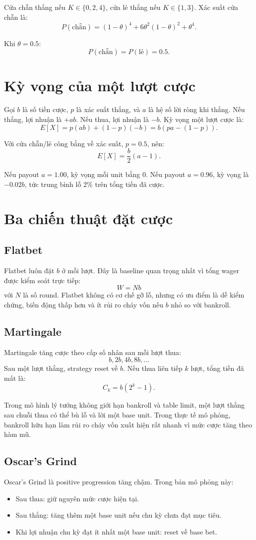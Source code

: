 \documentclass[12pt,a4paper]{article}
\begin{document}
Cửa chẵn thắng nếu \(K \in \{0,2,4\}\), cửa lẻ thắng nếu \(K \in \{1,3\}\). Xác suất cửa chẵn là:
\[
P(\text{chẵn})=(1-\theta)^4+6\theta^2(1-\theta)^2+\theta^4.
\]

Khi \(\theta=0.5\):
\[
P(\text{chẵn})=P(\text{lẻ})=0.5.
\]

\section{Kỳ vọng của một lượt cược}
Gọi \(b\) là số tiền cược, \(p\) là xác suất thắng, và \(a\) là hệ số lời ròng khi thắng. Nếu thắng, lợi nhuận là \(+ab\). Nếu thua, lợi nhuận là \(-b\). Kỳ vọng một lượt cược là:
\[
E[X]=p(ab)+(1-p)(-b)=b(pa-(1-p)).
\]

Với cửa chẵn/lẻ công bằng về xác suất, \(p=0.5\), nên:
\[
E[X]=\frac{b}{2}(a-1).
\]

Nếu payout \(a=1.00\), kỳ vọng mỗi unit bằng 0. Nếu payout \(a=0.96\), kỳ vọng là \(-0.02b\), tức trung bình lỗ 2\% trên tổng tiền đã cược.

\section{Ba chiến thuật đặt cược}
\subsection{Flatbet}
Flatbet luôn đặt \(b\) ở mỗi lượt. Đây là baseline quan trọng nhất vì tổng wager được kiểm soát trực tiếp:
\[
W=Nb
\]
với \(N\) là số round. Flatbet không có cơ chế gỡ lỗ, nhưng có ưu điểm là dễ kiểm chứng, biến động thấp hơn và ít rủi ro cháy vốn nếu \(b\) nhỏ so với bankroll.

\subsection{Martingale}
Martingale tăng cược theo cấp số nhân sau mỗi lượt thua:
\[
b, 2b, 4b, 8b, \ldots
\]
Sau một lượt thắng, strategy reset về \(b\). Nếu thua liên tiếp \(k\) lượt, tổng tiền đã mất là:
\[
C_k=b(2^k-1).
\]

Trong mô hình lý tưởng không giới hạn bankroll và table limit, một lượt thắng sau chuỗi thua có thể bù lỗ và lời một base unit. Trong thực tế mô phỏng, bankroll hữu hạn làm rủi ro cháy vốn xuất hiện rất nhanh vì mức cược tăng theo hàm mũ.

\subsection{Oscar's Grind}
Oscar's Grind là positive progression tăng chậm. Trong bản mô phỏng này:
\begin{itemize}
  \item Sau thua: giữ nguyên mức cược hiện tại.
  \item Sau thắng: tăng thêm một base unit nếu chu kỳ chưa đạt mục tiêu.
  \item Khi lợi nhuận chu kỳ đạt ít nhất một base unit: reset về base bet.
\end{itemize}
\end{document}
